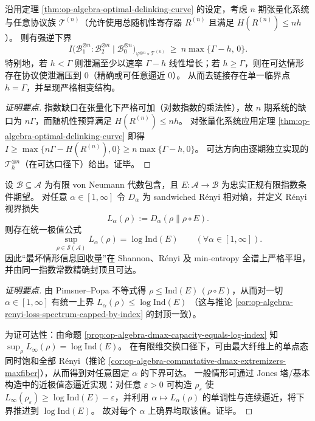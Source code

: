 \begin{theorem}\label{thm:op-algebra-multi-round-strong-converse-linear-leakage}
沿用定理 \ref{thm:op-algebra-optimal-delinking-curve} 的设定，考虑 \(n\) 期张量化系统与任意协议族 \(\mathcal{T}^{(n)}\)（允许使用总随机性寄存器 \(R^{(n)}\) 且满足 \(H(R^{(n)})\le nh\)）。
则有强逆下界
\[
\boxed{\;
I\bigl(\mathcal{B}_1^{\otimes n}:\mathcal{B}_2^{\otimes n}\mid \mathcal{B}_0^{\otimes n}\bigr)_{\varphi^{\otimes n}\circ\mathcal{T}^{(n)}}
\ \ge\ n\max\{\Gamma-h,\,0\}.\;}
\]
特别地，若 \(h<\Gamma\) 则泄漏至少以速率 \(\Gamma-h\) 线性增长；若 \(h\ge \Gamma\)，则在可达情形存在协议使泄漏压到 \(0\)（精确或可任意逼近 \(0\)）。
从而去链接存在单一临界点 \(h=\Gamma\)，并呈现严格相变结构。
\end{theorem}
\begin{proof}[证明要点]
指数缺口在张量化下严格可加（对数指数的乘法性），故 \(n\) 期系统的缺口为 \(n\Gamma\)，而随机性预算满足 \(H(R^{(n)})\le nh\)。
对张量化系统应用定理 \ref{thm:op-algebra-optimal-delinking-curve} 即得
\(
I\ge \max\{n\Gamma-H(R^{(n)}),0\}\ge n\max\{\Gamma-h,0\}
\)。
可达方向由逐期独立实现的 \(\mathcal{T}_h^{\otimes n}\)（在可达口径下）给出。证毕。
\end{proof}

\begin{corollary}\label{cor:op-algebra-renyi-flatness-sup-equals-log-index}
设 \(\mathcal{B}\subseteq\mathcal{A}\) 为有限 von Neumann 代数包含，且 \(E:\mathcal{A}\to\mathcal{B}\) 为忠实正规有限指数条件期望。
对任意 \(\alpha\in[1,\infty]\) 令 \(D_\alpha\) 为 sandwiched Rényi 相对熵，并定义 Rényi 视界损失
\[
L_\alpha(\rho):=D_\alpha(\rho\|\rho\!\circ\!E).
\]
则存在统一极值公式
\[
\boxed{\;
\sup_{\rho\in\mathcal{S}(\mathcal{A})}L_\alpha(\rho)=\log\mathrm{Ind}(E)\qquad(\forall \alpha\in[1,\infty]).\;}
\]
因此“最坏情形信息回收量”在 Shannon、Rényi 及 min-entropy 全谱上严格平坦，并由同一指数常数精确封顶且可达。
\end{corollary}
\begin{proof}[证明要点]
由 Pimsner--Popa 不等式得 \(\rho\le \mathrm{Ind}(E)\,(\rho\!\circ\!E)\)，从而对一切 \(\alpha\in[1,\infty]\) 有统一上界
\(
L_\alpha(\rho)\le \log\mathrm{Ind}(E)
\)
（这与推论 \ref{cor:op-algebra-renyi-loss-spectrum-capped-by-index} 的封顶一致）。
\par
为证可达性：由命题 \ref{prop:op-algebra-dmax-capacity-equals-log-index} 知 \(\sup_\rho L_\infty(\rho)=\log\mathrm{Ind}(E)\)。
在有限维交换口径下，可由最大纤维上的单点态同时饱和全部 Rényi（推论 \ref{cor:op-algebra-commutative-dmax-extremizers-maxfiber}），从而得到对任意固定 \(\alpha\) 的下界可达。
一般情形可通过 Jones 塔/基本构造中的近极值态逼近实现：对任意 \(\varepsilon>0\) 可构造 \(\rho_\varepsilon\) 使 \(L_\infty(\rho_\varepsilon)\ge \log\mathrm{Ind}(E)-\varepsilon\)，并利用 \(\alpha\mapsto L_\alpha(\rho)\) 的单调性与连续逼近，将下界推进到 \(\log\mathrm{Ind}(E)\)。
故对每个 \(\alpha\) 上确界均取该值。证毕。
\end{proof}


